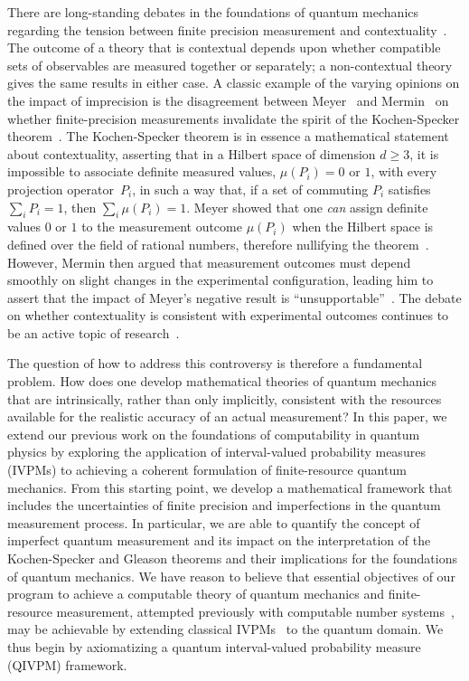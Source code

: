 \documentclass[english,reprint, aps, prl,superscriptaddress, showpacs,
showkeys, longbibliography, amsmath, amssymb]{revtex4-1}
\theoremstyle{plain}
\theoremstyle{definition}
\begin{document}
There are long-standing debates in the foundations of quantum
mechanics regarding the tension between finite precision measurement
and contextuality~\cite{BarrettKent2004,Appleby_2005}. The outcome
of a theory that is contextual depends upon
whether  compatible sets of observables are measured together or
separately; a non-contextual theory gives the same results in either
case.  A classic example of the varying opinions on the impact of
imprecision is the disagreement between
Meyer~\cite{PhysRevLett.83.3751} and 
Mermin~\cite{Mermin1999}  on whether finite-precision
measurements invalidate the spirit of the Kochen-Specker
theorem~\cite{kochenspecker1967,peres1995quantum}.  The Kochen-Specker  
theorem is in essence a
mathematical statement about contextuality, asserting that
in a Hilbert space of dimension $d \ge 3$, it is
impossible to associate definite measured values, $\mu(P_i)= 0$ or
$1$, with every projection operator~$P_i$, in such a way that, if a
set of commuting $P_i$ satisfies $\sum_i P_i = 1$, then
$\sum_i \mu(P_i) = 1$.   Meyer showed that one {\it can\/}
assign definite values $0$ or $1$ to the measurement outcome
$\mu(P_i)$ when the Hilbert space is defined over the field of
rational numbers, therefore nullifying the
theorem~\citep{PhysRevLett.83.3751}.  However, Mermin then argued
that measurement outcomes must depend smoothly on slight changes in
the experimental configuration, leading him to assert that the
impact of Meyer's negative result is
``unsupportable''~\citep{Mermin1999}.  The debate on
whether contextuality is consistent with experimental
outcomes continues to be an active topic of research~\citep{Kent1999,HavlicekKrennSummhammerSvozil2001,SimonBruknerZeilinger2001,Cabello2002,Larsson2002,Appleby2002,Peres2003,BarrettKent2004,Appleby_2005,Spekkens2005,GuehneKleinmannCabelloEtAl2010,MazurekPuseyKunjwalEtAl2016}.

The question of how to address this controversy is therefore a
fundamental problem.  How does one
develop mathematical theories of quantum mechanics that are
intrinsically, rather than only implicitly, consistent with the
resources available for the realistic accuracy of an actual
measurement?   In this paper, we extend our previous work on the
foundations of computability in quantum physics by exploring the
application of interval-valued probability measures (IVPMs) to
achieving a coherent formulation of finite-resource quantum mechanics.
From this starting point, we develop a mathematical framework that includes the
uncertainties of finite precision and imperfections in the quantum
measurement process.  In particular, we are able to quantify the concept of
imperfect quantum measurement and its impact on the interpretation of
the Kochen-Specker and Gleason theorems and their implications for the
foundations of quantum mechanics.  We have reason to believe that
essential objectives of our program to achieve a computable theory of
quantum mechanics and finite-resource measurement, attempted
previously with computable number
systems~\cite{usat,geometry2013apsrev4,DQT2014}, may be achievable by
extending classical IVPMs~\cite{JamisonLodwick2004} to the quantum
domain.  We thus begin by axiomatizing a quantum interval-valued
probability measure (QIVPM) framework.
\end{document}
